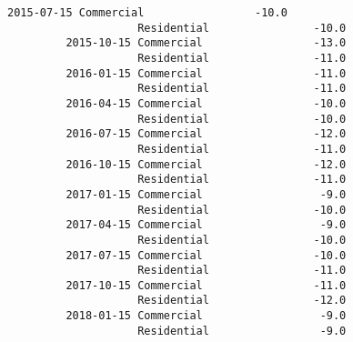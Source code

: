 \documentclass[11pt]{article}
\begin{document}
\begin{Verbatim}[commandchars=\\\{\}]
         2015-07-15 Commercial                 -10.0   
                    Residential                -10.0   
         2015-10-15 Commercial                 -13.0   
                    Residential                -11.0   
         2016-01-15 Commercial                 -11.0   
                    Residential                -11.0   
         2016-04-15 Commercial                 -10.0   
                    Residential                -10.0   
         2016-07-15 Commercial                 -12.0   
                    Residential                -11.0   
         2016-10-15 Commercial                 -12.0   
                    Residential                -11.0   
         2017-01-15 Commercial                  -9.0   
                    Residential                -10.0   
         2017-04-15 Commercial                  -9.0   
                    Residential                -10.0   
         2017-07-15 Commercial                 -10.0   
                    Residential                -11.0   
         2017-10-15 Commercial                 -11.0   
                    Residential                -12.0   
         2018-01-15 Commercial                  -9.0   
                    Residential                 -9.0   
         

\end{Verbatim}
\end{document}
